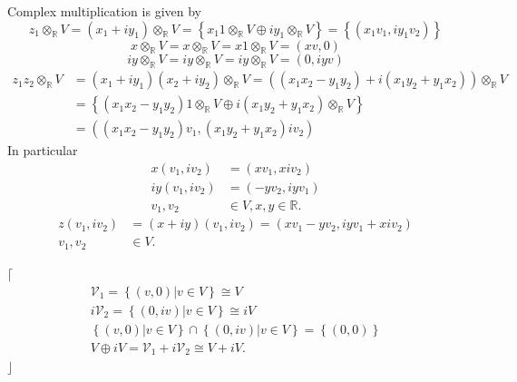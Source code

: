 \documentclass[aps,preprint]{revtex4}
\begin{document}
Complex multiplication is given by 
\begin{equation}
z_{1}\otimes _{\mathbb{R}}V=\left( x_{1}+iy_{1}\right) \otimes _{\mathbb{R}%
}V=\left\{ x_{1}1\otimes _{\mathbb{R}}V\oplus iy_{1}\otimes _{\mathbb{R}%
}V\right\} =\left\{ \left( x_{1}v_{1},iy_{1}v_{2}\right) \right\}
\end{equation}%
\begin{equation}
x\otimes _{\mathbb{R}}V=x\otimes _{\mathbb{R}}V=x1\otimes _{\mathbb{R}%
}V=\left( xv,0\right)
\end{equation}%
\begin{equation}
iy\otimes _{\mathbb{R}}V=iy\otimes _{\mathbb{R}}V=iy\otimes _{\mathbb{R}%
}V=\left( 0,iyv\right)
\end{equation}%
\begin{align}
z_{1}z_{2}\otimes _{\mathbb{R}}V& =\left( x_{1}+iy_{1}\right) \left(
x_{2}+iy_{2}\right) \otimes _{\mathbb{R}}V=\left( \left(
x_{1}x_{2}-y_{1}y_{2}\right) +i\left( x_{1}y_{2}+y_{1}x_{2}\right) \right)
\otimes _{\mathbb{R}}V \\
& =\left\{ \left( x_{1}x_{2}-y_{1}y_{2}\right) 1\otimes _{\mathbb{R}}V\oplus
i\left( x_{1}y_{2}+y_{1}x_{2}\right) \otimes _{\mathbb{R}}V\right\} \\
& =\left( \left( x_{1}x_{2}-y_{1}y_{2}\right) v_{1},\left(
x_{1}y_{2}+y_{1}x_{2}\right) iv_{2}\right)
\end{align}%
In particular 
\begin{align}
x\left( v_{1},iv_{2}\right) & =\left( xv_{1},xiv_{2}\right) \\
iy\left( v_{1},iv_{2}\right) & =\left( -yv_{2},iyv_{1}\right) \\
v_{1},v_{2}& \in V,x,y\in \mathbb{R}.
\end{align}%
\begin{align}
z\left( v_{1},iv_{2}\right) & =(x+iy)\left( v_{1},iv_{2}\right) =\left(
xv_{1}-yv_{2},iyv_{1}+xiv_{2}\right) \\
v_{1},v_{2}& \in V.
\end{align}

$\lceil$%
\begin{gather}
\mathcal{V}_{1}=\left\{ \left. \left( v,0\right) \right\vert v\in V\right\}
\cong V \\
i\mathcal{V}_{2}=\left\{ \left. \left( 0,iv\right) \right\vert v\in
V\right\} \cong iV \\
\left\{ \left. \left( v,0\right) \right\vert v\in V\right\} \cap\left\{
\left. \left( 0,iv\right) \right\vert v\in V\right\} =\left\{ \left(
0,0\right) \right\} \\
V\oplus iV=\mathcal{V}_{1}+i\mathcal{V}_{2}\cong V+iV.
\end{gather}
$\rfloor$
\end{document}
